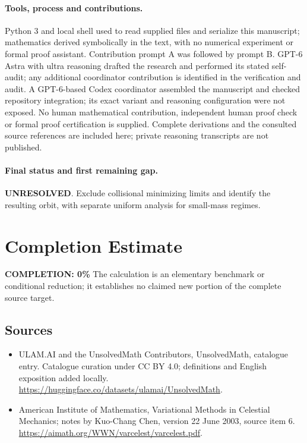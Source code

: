 \documentclass[11pt]{article}
\begin{document}
\paragraph{Tools, process and contributions.}
Python 3 and local shell used to read supplied files and serialize this manuscript; mathematics derived symbolically in the text, with no numerical experiment or formal proof assistant. Contribution prompt A was followed by prompt B. GPT-6 Astra with ultra reasoning drafted the research and performed its stated self-audit; any additional coordinator contribution is identified in the verification and audit. A GPT-6-based Codex coordinator assembled the manuscript and checked repository integration; its exact variant and reasoning configuration were not exposed. No human mathematical contribution, independent human proof check or formal proof certification is supplied. Complete derivations and the consulted source references are included here; private reasoning transcripts are not published.

\paragraph{Final status and first remaining gap.}
\textbf{UNRESOLVED}. Exclude collisional minimizing limits and identify the resulting orbit, with separate uniform analysis for small-mass regimes.

\section{Completion Estimate}
\noindent\textbf{COMPLETION: 0\%}
The calculation is an elementary benchmark or conditional reduction; it establishes no claimed new portion of the complete source target.

\subsection{Sources}
\begin{itemize}
\item[\hypertarget{source:statement:1}{S1}] ULAM.AI and the UnsolvedMath Contributors, UnsolvedMath, catalogue entry. Catalogue curation under CC BY 4.0; definitions and English exposition added locally.
\url{https://huggingface.co/datasets/ulamai/UnsolvedMath}.
\item[\hypertarget{source:statement:2}{S2}] American Institute of Mathematics, Variational Methods in Celestial Mechanics; notes by Kuo-Chang Chen, version 22 June 2003, source item 6.
\url{https://aimath.org/WWN/varcelest/varcelest.pdf}.
\end{itemize}
\label{end:statement}
\end{document}
